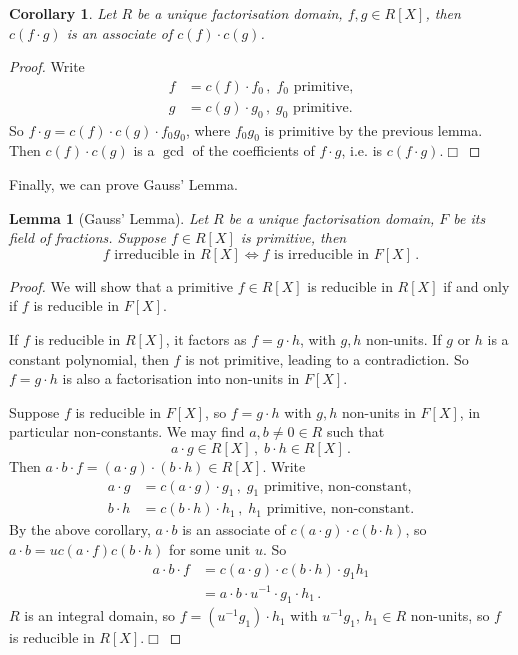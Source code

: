 \documentclass{article}
\theoremstyle{plain}\theoremheaderfont{\normalfont\itshape}\theorembodyfont{\rmfamily}\theoremseparator{.}\newtheorem*{rem}{Remark}\newtheorem*{ex}{Example}\newtheorem*{proof}{Proof}\newtheorem*{altp}{Alternative proof}\newtheorem*{nonex}{Non-Example}
\theoremstyle{plain}\theoremheaderfont{\normalfont\bfseries}\theorembodyfont{\rmfamily}\theoremseparator{.}\newtheorem{thm}{Theorem}[section]\newtheorem{lem}[thm]{Lemma}\newtheorem{prop}[thm]{Proposition}\newtheorem*{cor}{Corollary}\newtheorem{defn}[thm]{Definition}\newtheorem{clm}[thm]{Claim}\newtheorem{clminproof}{Claim}\newtheorem*{notn}{Notation}\newtheorem*{exer}{Exercise}\newtheorem*{lemnn}{Lemma}
\theoremstyle{break}\theoremheaderfont{\normalfont\itshape}\theorembodyfont{\rmfamily}\theoremseparator{.\medskip}\newtheorem*{proofskip}{Proof}\newtheorem*{exs}{Examples}\newtheorem*{rems}{Remarks}\newtheorem*{obs}{Observations}
\theoremstyle{break}\theoremheaderfont{\normalfont\bfseries}\theorembodyfont{\rmfamily}\theoremseparator{.\medskip}\newtheorem{lemskip}[thm]{Lemma}\newtheorem{defnskip}[thm]{Definition}\newtheorem{propskip}[thm]{Proposition}\newtheorem{thmskip}[thm]{Theorem}
\numberwithin{equation}{section}
\newcommand{\qed}{\hfill\ensuremath{\Box}}
\begin{document}
    \begin{cor}
        Let \(R\) be a unique factorisation domain, \(f,g\in R[X]\), then \(c(f\cdot g)\) is an associate of \(c(f)\cdot c(g)\).
    \end{cor}
    \begin{proof}
        Write
        \begin{align*}
            f&=c(f)\cdot f_0\,,\; f_0\text{ primitive,}\\
            g&=c(g)\cdot g_0\,,\; g_0\text{ primitive.}
        \end{align*}
        So \(f\cdot g=c(f)\cdot c(g)\cdot f_0g_0\), where \(f_0 g_0\) is primitive by the previous lemma. Then \(c(f)\cdot c(g)\) is a \(\gcd\) of the coefficients of \(f\cdot g\), i.e. is \(c(f\cdot g)\).\qed
    \end{proof}
    Finally, we can prove Gauss' Lemma.
    \begin{lem}[Gauss' Lemma]
        Let \(R\) be a unique factorisation domain, \(F\) be its field of fractions. Suppose \(f\in R[X]\) is primitive, then
        \[f\text{ irreducible in }R[X]\iff f\text{ is irreducible in }F[X]\,.\]
    \end{lem}
    \begin{proof}
        We will show that a primitive \(f\in R[X]\) is reducible in \(R[X]\) if and only if \(f\) is reducible in \(F[X]\).

        If \(f\) is reducible in \(R[X]\), it factors as \(f=g\cdot h\), with \(g,h\) non-units. If \(g\) or \(h\) is a constant polynomial, then \(f\) is not primitive, leading to a contradiction. So \(f=g\cdot h\) is also a factorisation into non-units in \(F[X]\).

        Suppose \(f\) is reducible in \(F[X]\), so \(f=g\cdot h\) with \(g,h\) non-units in \(F[X]\), in particular non-constants. We may find \(a,b\ne 0\in R\) such that
        \[a\cdot g\in R[X]\,,\; b\cdot h\in R[X]\,.\]
        Then \(a\cdot b\cdot f=(a\cdot g)\cdot (b\cdot h)\in R[X]\). Write
        \begin{align*}
            a\cdot g &=c(a\cdot g)\cdot g_1\,,\; g_1\text{ primitive, non-constant,}\\
            b\cdot h &=c(b\cdot h)\cdot h_1\,,\; h_1\text{ primitive, non-constant.}
        \end{align*}
        By the above corollary, \(a\cdot b\) is an associate of \(c(a\cdot g)\cdot c(b\cdot h)\), so \(a\cdot b=uc(a\cdot f)c(b\cdot h)\) for some unit \(u\). So
        \begin{align*}
            a\cdot b\cdot f&=c(a\cdot g)\cdot c(b\cdot h)\cdot g_1h_1\\
            &=a\cdot b\cdot u^{-1}\cdot g_1\cdot h_1\,.
        \end{align*}
        \(R\) is an integral domain, so \(f=(u^{-1}g_1)\cdot h_1\) with \(u^{-1}g_1\), \(h_1\in R\) non-units, so \(f\) is reducible in \(R[X]\).\qed
    \end{proof}
\end{document}
